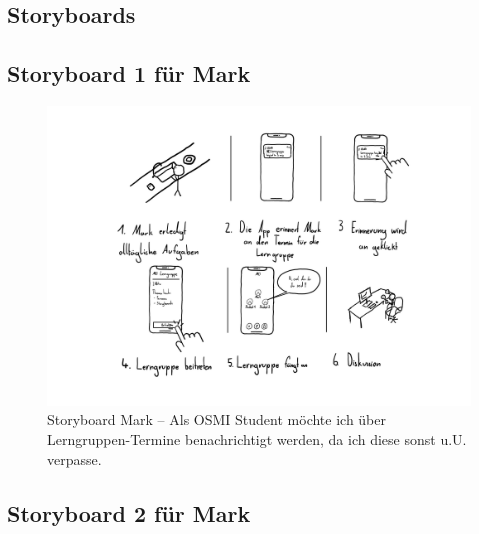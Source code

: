 \documentclass{article}
\begin{document}
\newpage

\begin{landscape}
	\section{Storyboards}

	\subsection{Storyboard 1 für Mark}

	\begin{figure}[h!]
		\includegraphics[height=0.7\textheight]{storyboard-1-mark}
		\centering
		\caption{Storyboard Mark – Als OSMI Student möchte ich über Lerngruppen-Termine benachrichtigt werden, da ich diese sonst u.U. verpasse.}
	\end{figure}

	\newpage

	\subsection{Storyboard 2 für Mark}


\end{landscape}
\end{document}
